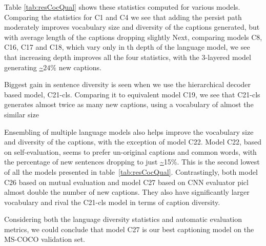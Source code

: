 Table \ref{tab:resCocQual} shows these statistics computed for various
models. 
Comparing the statistics for C1 and C4 we see that adding the persist path
moderately improves vocabulary size and diversity of the captions generated,
but with average length of the captions dropping slightly
Next, comparing models C8, C16, C17 and C18, which vary only in th depth of the
language model, we see that increasing depth improves all the four statistics,
with the 3-layered model generating \url{~}$24\%$ new captions.

Biggest gain in sentence diversity is seen when we use the hierarchical decoder
based model, C21-cls. 
Comparing it to equivalent model C19, we see that C21-cls generates almost twice
as many new captions, using a vocabulary of almost the similar size

Ensembling of multiple language models also helps improve the vocabulary size
and diversity of the captions, with the exception of model C22.
Model C22, based on self-evaluation, seems to prefer un-original captions and
common words, with the percentage of new sentences dropping to just \url{~}15\%.
This is the second lowest of all the models presented in
table~\ref{tab:resCocQual}.
Contrastingly, both model C26 based on mutual evaluation and model C27 based on CNN
evaluator picl almost double the number of new captions.
They also have significantly larger vocabulary and rival the C21-cls model in
terms of caption diversity.

Considering both the language diversity statistics and automatic evaluation
metrics, we could conclude that model C27 is our best captioning model on the
MS-COCO validation set.
